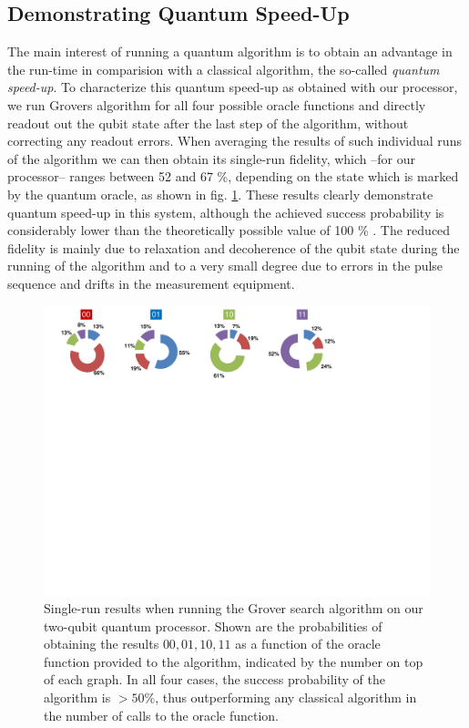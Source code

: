 \subsection{Demonstrating Quantum Speed-Up}

The main interest of running a quantum algorithm is to obtain an advantage in the run-time in comparision with a classical algorithm, the so-called {\it quantum speed-up}. To characterize this quantum speed-up as obtained with our processor, we run Grovers algorithm for all four possible oracle functions and directly readout out the qubit state after the last step of the algorithm, without correcting any readout errors. When averaging the results of such individual runs of the algorithm we can then obtain its single-run fidelity, which --for our processor-- ranges between 52 and 67 \%, depending on the state which is  marked by the quantum oracle, as shown in fig. \ref{fig:grover_single_shot_probabilities}. These results clearly demonstrate quantum speed-up in this system, although the achieved success probability is considerably lower than the theoretically possible value of 100 \% . The reduced fidelity is mainly due to relaxation and decoherence of the qubit state during the running of the algorithm and to a very small degree due to errors in the pulse sequence and drifts in the measurement equipment.

\begin{figure}[ht!]
		\centering
		\includegraphics[width=1.0\textwidth]{./material/papers/grover/figures/grover_algorithm_single_shot_probabilities}
	\caption[Single-run results of the Grover search algorithm]{Single-run results when running the Grover search algorithm on our two-qubit quantum processor. Shown are the probabilities of obtaining the results $00,01,10,11$ as a function of the oracle function provided to the algorithm, indicated by the number on top of each graph. In all four cases, the success probability of the algorithm is $> 50 \%$, thus outperforming any classical algorithm in the number of calls to the oracle function.}
	\label{fig:grover_single_shot_probabilities}
\end{figure}

